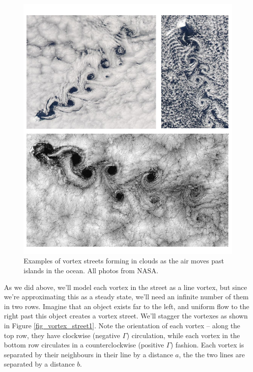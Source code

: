 \begin{figure}
\centering\includegraphics[width=0.9\linewidth]{Figures/Chapter4/fig_vortex_street_clouds}
\caption{Examples of vortex streets forming in clouds as the air moves past islands in the ocean.  All photos from NASA.}
\label{fig_vortex_street_clouds}
\end{figure}

As we did above, we'll model each vortex in the street as a line vortex, but since we're approximating this as a steady state, we'll need an infinite number of them in two rows.  Imagine that an object exists far to the left, and uniform flow to the right past this object creates a vortex street.  We'll stagger the vortexes as shown in Figure \ref{fig_vortex_street1}.  Note the orientation of each vortex -- along the top row, they have clockwise (negative $\Gamma$) circulation, while each vortex in the bottom row circulates in a counterclockwise (positive $\Gamma$) fashion.  Each vortex is separated by their neighbours in their line by a distance $a$, the the two lines are separated by a distance $b$.


